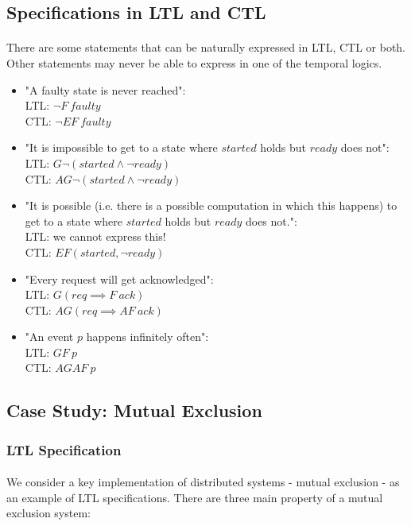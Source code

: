 \documentclass{article}
\theoremstyle{plain}
\theoremstyle{definition}
\begin{document}
\begin{multicols}{2}
\subsection{Specifications in LTL and CTL}

\paragraph{} There are some statements that can be naturally expressed in LTL, CTL or both. Other statements may never be able to express in one of the temporal logics.

\begin{itemize}
\item "A faulty state is never reached":\\ LTL: $\lnot F\ faulty$\\ CTL: $\lnot EF\ faulty$
\item "It is impossible to get to a state where $started$ holds but $ready$ does not":\\ LTL: $G\lnot(started \land \lnot ready)$\\ CTL: $AG\lnot(started \land \lnot ready)$
\item "It is possible (i.e. there is a possible computation in which this happens) to get to a state where $started$ holds but $ready$ does not.":\\ LTL: we cannot express this!\\CTL: $EF(started, \lnot ready)$
\item "Every request will get acknowledged":\\ LTL: $G(req \implies F\ ack)$\\ CTL: $AG(req \implies AF\ ack)$
\item "An event $p$ happens infinitely often":\\ LTL: $GF\ p$\\ CTL: $AGAF\ p$
\end{itemize}

\subsection{Case Study: Mutual Exclusion}

\subsubsection{LTL Specification}

\paragraph{} We consider a key implementation of distributed systems - mutual exclusion - as an example of LTL specifications. There are three main property of a mutual exclusion system:


\end{multicols}
\end{document}
